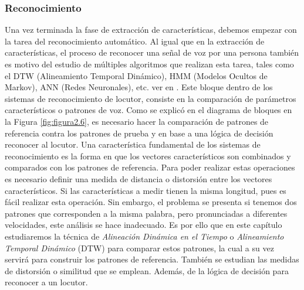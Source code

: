 \subsubsection{Reconocimiento}
Una vez terminada la fase de extracción de características, debemos empezar con la tarea del reconocimiento automático. Al igual que en la extracción de características, el proceso de reconocer una señal de voz por una persona también es motivo del estudio de múltiples algoritmos que realizan esta tarea, tales como el DTW (Alineamiento Temporal Dinámico), HMM (Modelos Ocultos de Markov), ANN (Redes Neuronales), etc. ver en \citep{luna}. 
\vskip 0.5cm
Este bloque dentro de los sistemas de reconocimiento de locutor, consiste en la comparación de parámetros característicos o patrones de voz. Como se explicó en el diagrama de bloques en la Figura \ref{fig:figura2.6}, es necesario hacer la comparación de patrones de referencia contra los patrones de prueba y en base a una lógica de decisión reconocer al locutor.
\vskip 0.5cm
Una característica fundamental de los sistemas de reconocimiento es la forma en que los vectores característicos son combinados y comparados con los patrones de referencia. Para poder realizar estas operaciones es necesario definir una medida de distancia o distorsión entre los vectores característicos. Si las características a medir tienen la misma longitud, pues es fácil realizar esta operación. Sin embargo, el problema se presenta si tenemos dos patrones que corresponden a la misma palabra, pero pronunciadas a diferentes velocidades, este análisis se hace inadecuado.
\vskip 0.5cm
Es por ello que en este capítulo estudiaremos la técnica de \textit{Alineación Dinámica en el Tiempo} o \textit{Alineamiento Temporal Dinámico} (DTW) para comparar estos patrones, la cual a su vez servirá para construir los patrones de referencia. También se estudian las medidas de distorsión o similitud que se emplean. Además, de la lógica de decisión para reconocer a un locutor.
\vskip 0.5cm
